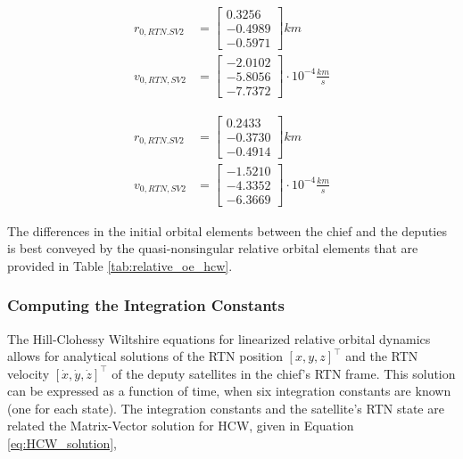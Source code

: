 \begin{align} \label{eq:SV2_HCW_RTN_init}
    r_{0, RTN. SV2} &= \begin{bmatrix}
        0.3256 \\
        -0.4989 \\
        -0.5971
    \end{bmatrix} km \\
    v_{0, RTN, SV2} &= \begin{bmatrix}
        -2.0102 \\
        -5.8056 \\
        -7.7372
    \end{bmatrix}\cdot 10^{-4} \frac{km}{s}
\end{align}

\begin{align} \label{eq:SV3_HCW_RTN_init}
    r_{0, RTN. SV2} &= \begin{bmatrix}
        0.2433 \\
        -0.3730 \\
        -0.4914
    \end{bmatrix} km \\
    v_{0, RTN, SV2} &= \begin{bmatrix}
        -1.5210 \\
        -4.3352 \\
        -6.3669
    \end{bmatrix}\cdot 10^{-4} \frac{km}{s}
\end{align}

The differences in the initial orbital elements between the chief and the deputies is best conveyed by the quasi-nonsingular relative orbital elements that are provided in Table \ref{tab:relative_oe_hcw}.

\subsubsection{Computing the Integration Constants}

The Hill-Clohessy Wiltshire equations for linearized relative orbital dynamics allows for analytical solutions of the RTN position $[x, y, z]^\top$ and the RTN velocity $[\dot{x}, \dot{y}, \dot{z}]^\top$ of the deputy satellites in the chief's RTN frame. This solution can be expressed as a function of time, when six integration constants are known (one for each state). The integration constants and the satellite's RTN state are related the Matrix-Vector solution for HCW, given in Equation \ref{eq:HCW_solution}, 


